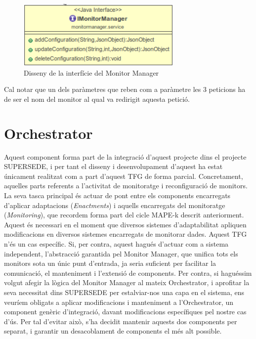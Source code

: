 \begin{figure}[!h]
\centering
\includegraphics[width=8cm]{Figures/monitor-manager-interface}
\decoRule
\caption{Disseny de la interfície del Monitor Manager}
\label{fig:monitor-manager}
\end{figure}

Cal notar que un dels paràmetres que reben com a paràmetre les 3 peticions ha de ser el nom del monitor al qual va redirigit aquesta petició. 

\section{Orchestrator}

Aquest component forma part de la integració d'aquest projecte dins el projecte SUPERSEDE, i per tant el disseny i desenvolupament d'aquest ha estat únicament realitzat com a part d'aquest TFG de forma parcial. Concretament, aquelles parts referents a l'activitat de monitoratge i reconfiguració de monitors.\\

La seva tasca principal és actuar de pont entre els components encarregats d'aplicar adaptacions (\textit{Enactments}) i aquells encarregats del monitoratge (\textit{Monitoring}), que recordem forma part del cicle MAPE-k descrit anteriorment. Aquest és necessari en el moment que diversos sistemes d'adaptabilitat apliquen modificacions en diversos sistemes encarregats de monitorar dades. Aquest TFG n'és un cas específic. Si, per contra, aquest hagués d'actuar com a sistema independent, l'abstracció garantida pel Monitor Manager, que unifica tots els monitors sota un únic punt d'entrada, ja seria suficient per facilitar la comunicació, el manteniment i l'extensió de components. Per contra, si haguéssim volgut afegir la lògica del Monitor Manager al mateix Orchestrator, i aprofitar la seva necessitat dins SUPERSEDE per estalviar-nos una capa en el sistema, ens veuríem obligats a aplicar modificacions i manteniment a l'Orchestrator, un component genèric d'integració, davant modificacions específiques pel nostre cas d'ús. Per tal d'evitar això, s'ha decidit mantenir aquests dos components per separat, i garantir un desacoblament de components el més alt possible.\\

